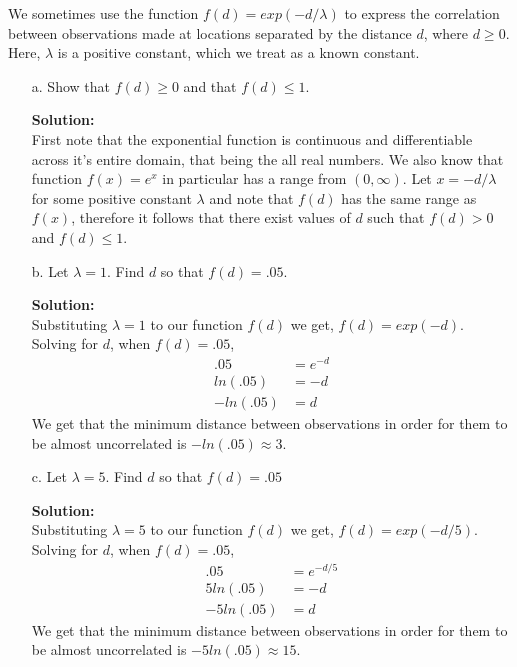 \documentclass[12pt]{article}
\makeatletter
\theoremstyle{homework}
\newenvironment{exercise}[1]
{\def\@currentlabel{#1}\exercisecore}
{\endexercisecore}
\newcommand{\localhead}[1]{\par\smallskip\noindent\textbf{#1}\nobreak\\}%
\newcommand\solution{\localhead{Solution:}}
\makeatother
\begin{document}
\begin{exercise}{5} We sometimes use the function $f(d) = exp(-d/\lambda)$ to express the correlation between observations 
  made at locations separated by the distance $d$, where $d \geq 0$. Here, $\lambda$ is a positive constant, which we treat as a known constant. \\
  \begin{enumerate}
    \item[a.] Show that $f(d) \geq 0$ and that $f(d) \leq 1$.\\
    \solution First note that the exponential function is continuous and differentiable across it's entire domain, that being the all real numbers. We also know 
    that function $f(x) = e^x$ in particular has a range from $(0, \infty)$. Let $x = -d/\lambda$ for some positive constant $\lambda$ and note that $f(d)$ has the same range 
    as $f(x)$, therefore it follows that there exist values of $d$ such that $f(d) > 0$ and $f(d) \leq 1$.
    \vspace{.15in}

    \item[b.] Let $\lambda = 1$. Find $d$ so that $f(d) = .05$.\\
    \solution Substituting $\lambda = 1$ to our function $f(d)$ we get, $f(d) = exp(-d)$. Solving for $d$, when $f(d) = .05$, 
    \begin{align*}
      .05 &= e^{-d}\\
      ln(.05) &= -d\\
      -ln(.05) &= d
    \end{align*}
    We get that the minimum distance between observations in order for them to be almost uncorrelated is $-ln(.05) \approx 3$. 
    \vspace{.15in}


    \item[c.] Let $\lambda = 5$. Find $d$ so that $f(d) = .05$\\
    \solution Substituting $\lambda = 5$ to our function $f(d)$ we get, $f(d) = exp(-d/5)$. Solving for $d$, when $f(d) = .05$, 
    \begin{align*}
      .05 &= e^{-d/5}\\
      5ln(.05) &= -d\\
      -5ln(.05) &= d
    \end{align*}
    We get that the minimum distance between observations in order for them to be almost uncorrelated is $-5ln(.05) \approx 15$. 
    \vspace{.15in}



\end{enumerate}
\end{exercise}
\end{document}
